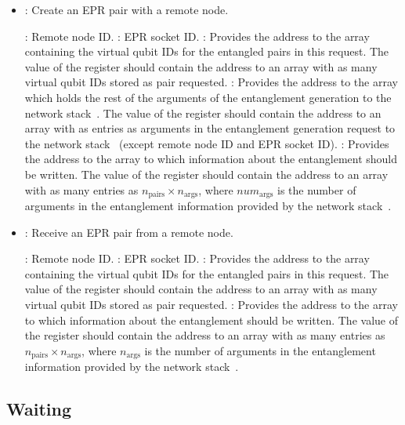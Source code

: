 \begin{itemize}
  \item {}: Create an EPR pair with a remote node.

        : Remote node ID.
        : EPR socket ID.
        : Provides the address to the array containing the virtual qubit IDs for the entangled pairs in this request.
              The value of the register should contain the address to an array with as many virtual qubit IDs stored as pair requested.
        : Provides the address to the array which holds the rest of the arguments of the entanglement generation to the network stack~\cite{dahlberg2019linklayer,kozlowski2020networklayer}.
              The value of the register should contain the address to an array with as entries as arguments in the entanglement generation request to the network stack~\cite{dahlberg2019linklayer,kozlowski2020networklayer} (except remote node ID and EPR socket ID).
        : Provides the address to the array to which information about the entanglement should be written.
              The value of the register should contain the address to an array with as many entries as $n_\mathrm{pairs} \times n_\mathrm{args}$, where $num_\mathrm{args}$ is the number of arguments in the entanglement information provided by the network stack~\cite{dahlberg2019linklayer,kozlowski2020networklayer}.
  \item {}: Receive an EPR pair from a remote node.

        : Remote node ID.
        : EPR socket ID.
        : Provides the address to the array containing the virtual qubit IDs for the entangled pairs in this request.
              The value of the register should contain the address to an array with as many virtual qubit IDs stored as pair requested.
        : Provides the address to the array to which information about the entanglement should be written.
              The value of the register should contain the address to an array with as many entries as $n_\mathrm{pairs} \times n_\mathrm{args}$, where $n_\mathrm{args}$ is the number of arguments in the entanglement information provided by the network stack~\cite{dahlberg2019linklayer,kozlowski2020networklayer}.
\end{itemize}

\subsection{Waiting}
\label{netqasm:sec:waiting}

